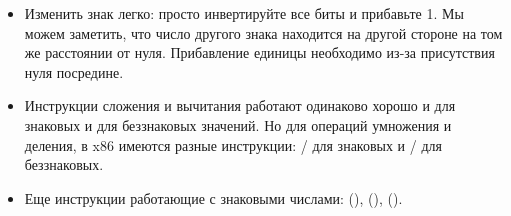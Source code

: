 \begin{itemize}
	.

\label{sec:signednumbers:negation}
\item Изменить знак легко: просто инвертируйте все биты и прибавьте 1.
Мы можем заметить, что число другого знака находится на другой стороне на том же расстоянии от нуля.
Прибавление единицы необходимо из-за присутствия нуля посредине.

\item Инструкции сложения и вычитания работают одинаково хорошо и для знаковых и для беззнаковых значений.
	Но для операций умножения и деления, в x86 имеются разные инструкции:
	/ для знаковых и / для беззнаковых.

\item Еще инструкции работающие с знаковыми числами:
	 (),  (),  ().
\end{itemize}

